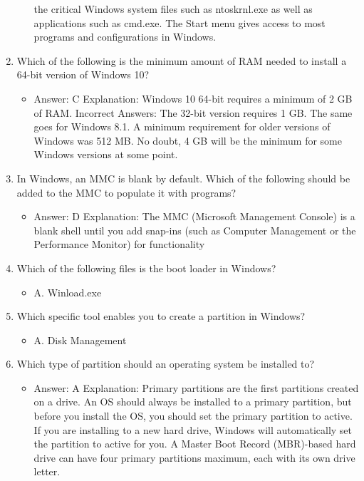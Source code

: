 \documentclass{article}
\begin{document}
\begin{enumerate}
\begin{itemize}
the critical Windows system files such as ntoskrnl.exe as well as applications such
as cmd.exe. The Start menu gives access to most programs and configurations in
Windows.
    \end{itemize}
    \item Which of the following is the minimum amount of RAM needed to
install a 64-bit version of Windows 10?
     \begin{itemize}
         \item Answer: C
Explanation: Windows 10 64-bit requires a minimum of 2 GB of RAM.
Incorrect Answers: The 32-bit version requires 1 GB. The same goes for Windows 8.1.
A minimum requirement for older versions of Windows was 512 MB. No doubt, 4 GB
will be the minimum for some Windows versions at some point.
     \end{itemize}
     \item In Windows, an MMC is blank by default. Which of the following
should be added to the MMC to populate it with programs?
     \begin{itemize}
         \item Answer: D
Explanation: The MMC (Microsoft Management Console) is a blank shell until you
add snap-ins (such as Computer Management or the Performance Monitor) for
functionality
     \end{itemize}
     \item Which of the following files is the boot loader in Windows?
     \begin{itemize}
         \item A. Winload.exe
     \end{itemize}
     \item Which specific tool enables you to create a partition in Windows?
     \begin{itemize}
         \item A. Disk Management
     \end{itemize}
     \item Which type of partition should an operating system be installed to?
     \begin{itemize}
         \item Answer: A
Explanation: Primary partitions are the first partitions created on a drive. An OS should
always be installed to a primary partition, but before you install the OS, you should set
the primary partition to active. If you are installing to a new hard drive, Windows will
automatically set the partition to active for you. A Master Boot Record (MBR)-based
hard drive can have four primary partitions maximum, each with its own drive letter.

\end{itemize}
\end{enumerate}
\end{document}
